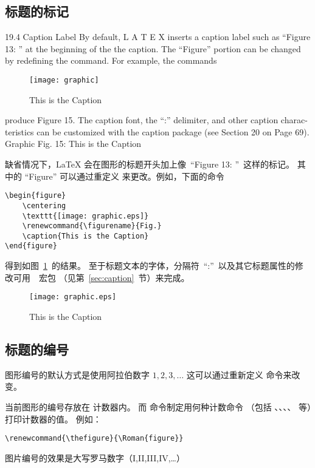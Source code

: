 \subsection{标题的标记}\label{ssec:captionlabel}

19.4 Caption Label
By default, L
A T E X inserts a caption label such as “Figure 13: ” at the beginning of the
the caption. The “Figure” portion can be changed by redefining the \figurename
command. For example, the commands
\begin{figure}
	\centering
	\texttt{[image: graphic]}
	\renewcommand{\figurename}{Fig.}
	\caption{This is the Caption}
\end{figure}
produce Figure 15. The caption font, the “:” delimiter, and other caption charac-
teristics can be customized with the caption package (see Section 20 on Page 69).
Graphic
Fig. 15: This is the Caption

缺省情况下，\LaTeX{} 会在图形的标题开头加上像~``Figure 13: ''~这样的标记。
其中的 ``Figure'' 可以通过重定义  来更改。例如，下面的命令
\begin{lstlisting}
\begin{figure} 
	\centering 
	\texttt{[image: graphic.eps]} 
	\renewcommand{\figurename}{Fig.} 
	\caption{This is the Caption} 
\end{figure}
\end{lstlisting}
得到如图~\ref{fig:figname}~的结果。
至于标题文本的字体，分隔符~``:''~以及其它标题属性的修改可用~~宏包
（见第~\ref{sec:caption}~节）来完成。

\begin{figure} 
	\centering 
	\texttt{[image: graphic.eps]} 
	\renewcommand{\figurename}{Fig.} 
	\caption{This is the Caption}\label{fig:figname} 
\end{figure}

\subsection{标题的编号}

图形编号的默认方式是使用阿拉伯数字 $1,2,3,\dots$
这可以通过重新定义  命令来改变。

当前图形的编号存放在  计数器内。
而  命令制定用何种计数命令
（包括 、、、、 等）打印计数器的值。
例如：
\begin{lstlisting}
\renewcommand{\thefigure}{\Roman{figure}}
\end{lstlisting}
图片编号的效果是大写罗马数字（I,II,III,IV,\dots）

